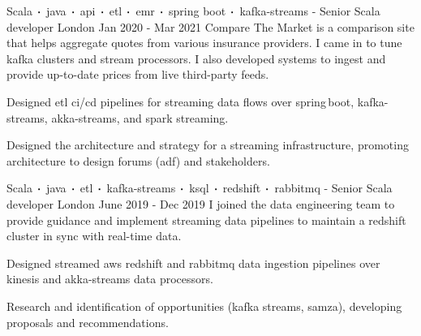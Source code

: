 \begin{cventries}
    \cventry
    {Scala$\sqbig$java$\sqbig$api$\sqbig$etl$\sqbig$emr$\sqbig$spring boot$\sqbig$kafka-streams}
    { - Senior Scala developer}
    {London}
    {Jan 2020 - Mar 2021}
    {Compare The Market is a comparison site that helps aggregate quotes from various insurance providers. I came in to tune kafka clusters and stream processors. I also developed systems to ingest and provide up-to-date prices from live third-party feeds.}
    {
        \begin{cvitems}
            \item{Designed etl ci/cd pipelines for streaming data flows over spring\,boot, kafka-streams, akka-streams, and spark streaming.}
            \item{Designed the architecture and strategy for a streaming infrastructure, promoting architecture to design forums (adf) and stakeholders.}
        \end{cvitems}
    }

    \cventry
    {Scala$\sqbig$java$\sqbig$etl$\sqbig$kafka-streams$\sqbig$ksql$\sqbig$redshift$\sqbig$rabbitmq}
    { - Senior Scala developer}
    {London}
    {June 2019 - Dec 2019}
    {I joined the data engineering team to provide guidance and implement streaming data pipelines to maintain a redshift cluster in sync with real-time data.}
    {
        \begin{cvitems}
            \item{Designed streamed aws redshift and rabbitmq data ingestion pipelines over kinesis and akka-streams data processors. }
            \item{Research and identification of opportunities (kafka streams, samza), developing proposals and recommendations.}
        \end{cvitems}
    }


\end{cventries}
